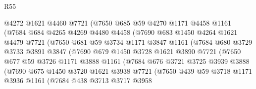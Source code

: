 \begin{lexlean}{R55}
\begin{coremodule}
                  @4272
                  @1621
                  @4460
                  @7721
                  (@7650
                    @685
                    @59
                    @4270
                    @1171
                    @4458
                    @1161
                    (@7684
                      @684
                      @4265
                      @4269
                      @4480
                      @4458
                      (@7690
                        @683
                        @1450
                        @4264
                        @1621
                        @4479
                        @7721
                        (@7650
                          @681
                          @59
                          @3734
                          @1171
                          @3847
                          @1161
                          (@7684
                            @680
                            @3729
                            @3733
                            @3891
                            @3847
                            (@7690
                              @679
                              @1450
                              @3728
                              @1621
                              @3890
                              @7721
                              (@7650
                                @677
                                @59
                                @3726
                                @1171
                                @3888
                                @1161
                                (@7684
                                  @676
                                  @3721
                                  @3725
                                  @3939
                                  @3888
                                  (@7690
                                    @675
                                    @1450
                                    @3720
                                    @1621
                                    @3938
                                    @7721
                                    (@7650
                                      @439
                                      @59
                                      @3718
                                      @1171
                                      @3936
                                      @1161
                                      (@7684
                                        @438
                                        @3713
                                        @3717
                                        @3958

\end{coremodule}
\end{lexlean}
